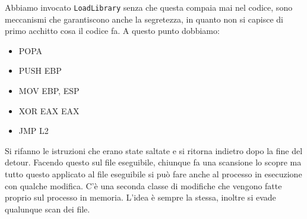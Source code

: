 \documentclass[12pt, oneside]{extbook}
\begin{document}
Abbiamo invocato \texttt{LoadLibrary} senza che questa compaia mai nel codice, sono meccanismi che garantiscono anche la segretezza, in quanto non si capisce di primo acchitto cosa il codice fa. A questo punto dobbiamo:
\begin{itemize}
	\item POPA
	\item PUSH EBP
	\item MOV EBP, ESP
	\item XOR EAX EAX
	\item JMP L2
\end{itemize}
Si rifanno le istruzioni che erano state saltate e si ritorna indietro dopo la fine del detour. Facendo questo sul file eseguibile, chiunque fa una scansione lo scopre ma tutto questo applicato al file eseguibile si può fare anche al processo in esecuzione con qualche modifica. C'è una seconda classe di modifiche che vengono fatte proprio sul processo in memoria. L'idea è sempre la stessa, inoltre si evade qualunque scan dei file.
\end{document}
